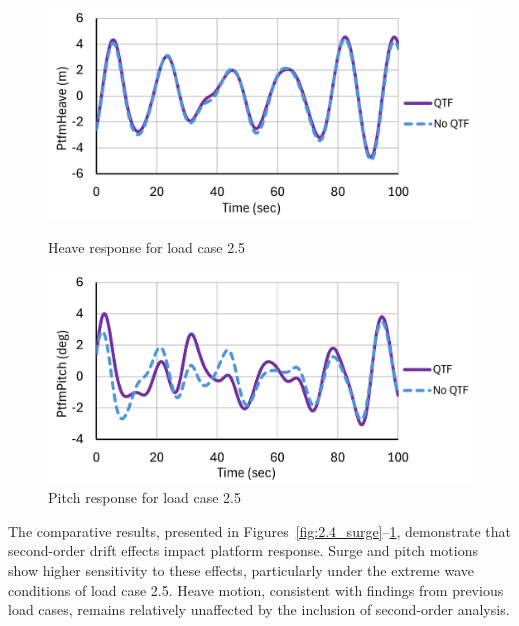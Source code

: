 \documentclass[a4paper, 11pt]{article}
\begin{document}
\begin{figure}[H]
    \begin{minipage}{0.49\textwidth}
        \centering
        \includegraphics[width=1\textwidth]{2.5_heave.png}
        \caption{\small Heave response for load case 2.5}
        \label{fig:2.5_heave}
    \end{minipage}
    \hfill
    \begin{minipage}{0.49\textwidth}
        \centering
        \vspace{-0.3cm}
        \includegraphics[width=1\textwidth]{2.5_pitch.png}
        \caption{\small Pitch response for load case 2.5}
        \label{fig:2.5_pitch}
    \end{minipage}
\end{figure}

The comparative results, presented in Figures~\ref{fig:2.4_surge}--\ref{fig:2.5_pitch}, demonstrate that second-order drift effects impact platform response. Surge and pitch motions show higher sensitivity to these effects, particularly under the extreme wave conditions of load case 2.5. Heave motion, consistent with findings from previous load cases, remains relatively unaffected by the inclusion of second-order analysis.
\end{document}
